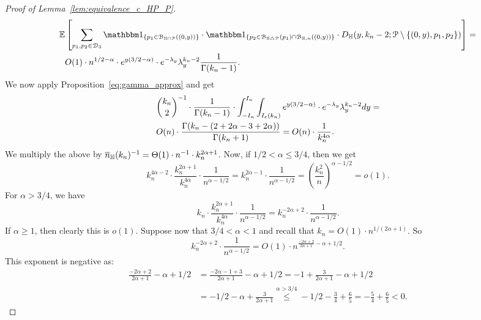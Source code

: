 \begin{proof}[Proof of Lemma~\ref{lem:equivalence_c_HP_P}]
\begin{equation}
\begin{split}
{\mathbb E}& \left[  \sum_{p_1, p_2\in \dom{3}} \ind{p_1 \in \BallInter{(0,y)}} \cdot \ind{p_2 \in 
\BallSym{p_1} \cap \BallHyp{(0,y)}} \cdot 
D_\H (y,k_n-2;\Pcal \setminus \{ (0,y),p_1,p_2\})  \right] = \\
& O(1) \cdot n^{1/2 -\alpha} \cdot e^{y(3/2 - \alpha)} \cdot e^{-\lambda_y} \lambda_y^{k_n-2} \frac{1}{\Gamma (k_n-1)}. 
\end{split}
\end{equation}
We now apply Proposition~\ref{eq:gamma_approx} and get 
\begin{equation*}
\begin{split}
&{k_n \choose 2}^{-1}\cdot  \frac{1}{\Gamma (k_n-1)} \cdot \int_{-I_n}^{I_n} \int_{I_\varepsilon(k_n)} 
e^{y(3/2 - \alpha)} \cdot e^{-\lambda_y} \lambda_y^{k_n-2} dy  = \\
& O(n) \cdot \frac{\Gamma (k_n - (2 + 2\alpha - 3 + 2\alpha))}{\Gamma(k_n+1)} 
=O(n) \cdot \frac{1}{k_n^{4\alpha}}.
\end{split}
\end{equation*}
We multiply the above by $\overline{n}_{\mathbb{H}}(k_n)^{-1} = \Theta (1) \cdot n^{-1} \cdot k_n^{2\alpha +1}$.
Now, if $1/2 < \alpha \leq 3/4$, then we get 
$$k_n^{4\alpha -2}  \cdot \frac{k_n^{2\alpha +1}}{k_n^{4\alpha}} \cdot \frac{1}{n^{\alpha -1/2}}= k_n^{2\alpha -1} \cdot  \frac{1}{n^{\alpha -1/2}}=\left(\frac{k_n^2}{n} \right)^{\alpha -1/2} =o(1).$$
For $\alpha > 3/4$, we have  
$$k_n \cdot \frac{k_n^{2\alpha +1}}{k_n^{4\alpha}} \cdot \frac{1}{n^{\alpha -1/2}}= k_n^{-2\alpha +2} \cdot  \frac{1}{n^{\alpha -1/2}}.$$
If $\alpha\geq 1$, then clearly this is $o(1)$. Suppose now that $3/4 < \alpha <1$ and recall that
$k_n = O(1) \cdot n^{1/(2\alpha +1)}$. So 
$$k_n^{-2\alpha +2} \cdot  \frac{1}{n^{\alpha -1/2}} =O(1) \cdot n^{\frac{-2\alpha +2}{2\alpha +1} - \alpha + 1/2}. $$
This exponent is negative as:
\begin{equation*}
\begin{split}
\frac{-2\alpha +2}{2\alpha +1} - \alpha + 1/2 &= \frac{-2\alpha -1+3}{2\alpha +1} - \alpha + 1/2 
= -1 + \frac{3}{2\alpha +1} - \alpha +1/2 \\
&= -1/2 - \alpha +\frac{3}{2\alpha +1} 
\stackrel{\alpha > 3/4}{\leq} -1/2 - \frac34 +\frac{6}{5} = - \frac{5}{4} + \frac{6}{5} <0.
\end{split}
\end{equation*}


\end{proof}

